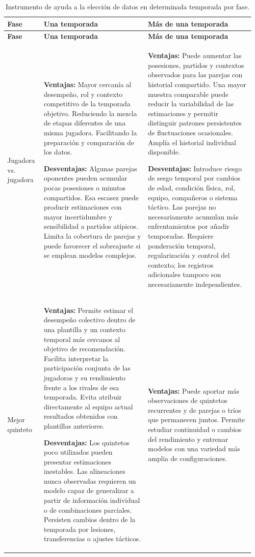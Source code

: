 \begin{longtable}{@{}p{2.15cm}p{5.35cm}p{5.35cm}@{}}
\caption{Instrumento de ayuda a la elección de datos en determinada temporada por fase.}\\
\toprule
\textbf{Fase}&\textbf{Una temporada}&\textbf{Más de una temporada}\\\midrule\endfirsthead
\toprule\textbf{Fase}&\textbf{Una temporada}&\textbf{Más de una temporada}\\\midrule\endhead
Jugadora vs. jugadora&
\textbf{Ventajas:} Mayor cercanía al desempeño, rol y contexto competitivo de la temporada objetivo. Reduciendo la mezcla de etapas diferentes de una misma jugadora. Facilitando la preparación y comparación de los datos.

\textbf{Desventajas:} Algunas parejas oponentes pueden acumular pocas posesiones o minutos compartidos. Esa escasez puede producir estimaciones con mayor incertidumbre y sensibilidad a partidos atípicos. Limita la cobertura de parejas y puede favorecer el sobreajuste si se emplean modelos complejos.&
\textbf{Ventajas:} Puede aumentar las posesiones, partidos y contextos observados para las parejas con historial compartido. Una mayor muestra comparable puede reducir la variabilidad de las estimaciones y permitir distinguir patrones persistentes de fluctuaciones ocasionales. Amplía el historial individual disponible.

\textbf{Desventajas:} Introduce riesgo de sesgo temporal por cambios de edad, condición física, rol, equipo, compañeros o sistema táctico. Las parejas no necesariamente acumulan más enfrentamientos por añadir temporadas. Requiere ponderación temporal, regularización y control del contexto; los registros adicionales tampoco son necesariamente independientes.\\\midrule
Mejor quinteto&
\textbf{Ventajas:} Permite estimar el desempeño colectivo dentro de una plantilla y un contexto temporal más cercanos al objetivo de recomendación. Facilita interpretar la participación conjunta de las jugadoras y su rendimiento frente a los rivales de esa temporada. Evita atribuir directamente al equipo actual resultados obtenidos con plantillas anteriores.

\textbf{Desventajas:} Los quintetos poco utilizados pueden presentar estimaciones inestables. Las alineaciones nunca observadas requieren un modelo capaz de generalizar a partir de información individual o de combinaciones parciales. Persisten cambios dentro de la temporada por lesiones, transferencias o ajustes tácticos.&
\textbf{Ventajas:} Puede aportar más observaciones de quintetos recurrentes y de parejas o tríos que permanecen juntos. Permite estudiar continuidad o cambios del rendimiento y entrenar modelos con una variedad más amplia de configuraciones.


\end{longtable}
